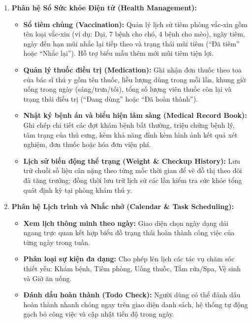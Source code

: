 \begin{enumerate}
    \item \textbf{Phân hệ Sổ Sức khỏe Điện tử (Health Management):}
    \begin{itemize}
        \item \textbf{Sổ tiêm chủng (Vaccination):} Quản lý lịch sử tiêm phòng vắc-xin gồm tên loại vắc-xin (ví dụ: Dại, 7 bệnh cho chó, 4 bệnh cho mèo), ngày tiêm, ngày đến hạn mũi nhắc lại tiếp theo và trạng thái mũi tiêm (``Đã tiêm'' hoặc ``Nhắc lại''). Hỗ trợ biểu mẫu thêm mới mũi tiêm tiện lợi.
        \item \textbf{Quản lý thuốc điều trị (Medication):} Ghi nhận đơn thuốc theo toa của bác sĩ thú y gồm tên thuốc, liều lượng dùng trong mỗi lần, khung giờ uống trong ngày (sáng/trưa/tối), tổng số lượng viên thuốc còn lại và trạng thái điều trị (``Đang dùng'' hoặc ``Đã hoàn thành'').
        \item \textbf{Nhật ký bệnh án và biểu hiện lâm sàng (Medical Record Book):} Ghi chép chi tiết các đợt khám bệnh bất thường, triệu chứng bệnh lý, tâm trạng của thú cưng, kèm khả năng đính kèm hình ảnh kết quả xét nghiệm, đơn thuốc hoặc hóa đơn viện phí.
        \item \textbf{Lịch sử biến động thể trạng (Weight \& Checkup History):} Lưu trữ chuỗi số liệu cân nặng theo từng mốc thời gian để vẽ đồ thị theo dõi đà tăng trưởng; đồng thời lưu trữ lịch sử các lần kiểm tra sức khỏe tổng quát định kỳ tại phòng khám thú y.
    \end{itemize}

    \item \textbf{Phân hệ Lịch trình và Nhắc nhở (Calendar \& Task Scheduling):}
    \begin{itemize}
        \item \textbf{Xem lịch thông minh theo ngày:} Giao diện chọn ngày dạng dải ngang trực quan kết hợp biểu đồ trạng thái hoàn thành công việc của từng ngày trong tuần.
        \item \textbf{Phân loại sự kiện đa dạng:} Cho phép lên lịch các tác vụ chăm sóc thiết yếu: Khám bệnh, Tiêm phòng, Uống thuốc, Tắm rửa/Spa, Vệ sinh và Giờ ăn uống.
        \item \textbf{Đánh dấu hoàn thành (Todo Check):} Người dùng có thể đánh dấu hoàn thành nhanh chóng ngay trên giao diện danh sách, hệ thống tự động gạch bỏ công việc và cập nhật tiến độ trong ngày.
    \end{itemize}


\end{enumerate}
